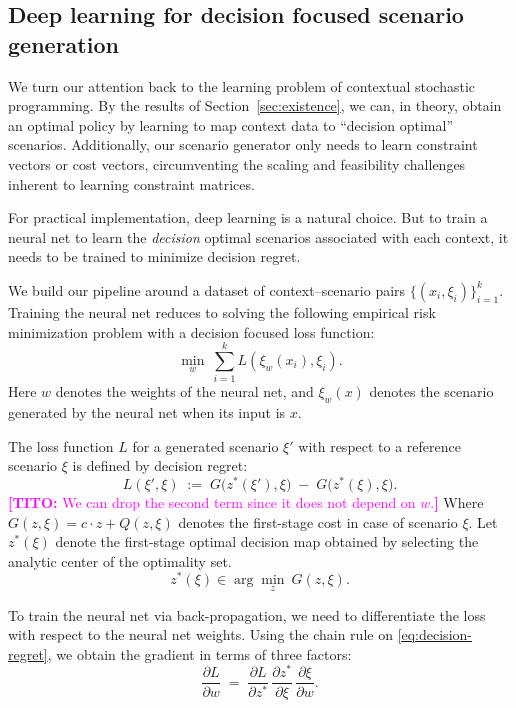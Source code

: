 \documentclass{article}
\newcommand{\thc}[1]{\textcolor{magenta}{\textbf{[TITO:} #1\textbf{]}}}
\theoremstyle{plain}
\theoremstyle{definition}
\theoremstyle{remark}
\begin{document}
\subsection{Deep learning for decision focused scenario generation}
\label{sec:deep-learning}
We turn our attention back to the learning problem of contextual stochastic programming. By the results of Section~\ref{sec:existence}, we can, in theory, obtain an optimal policy by learning to map context data to ``decision optimal'' scenarios. Additionally, our scenario generator only needs to learn constraint vectors or cost vectors, circumventing the scaling and feasibility challenges inherent to learning constraint matrices.

For practical implementation, deep learning is a natural choice. But to train a neural net to learn the \textit{decision} optimal scenarios associated with each context, it needs to be trained to minimize decision regret.

We build our pipeline around a dataset of context--scenario pairs $\{(x_i,\xi_i)\}_{i=1}^k$. Training the neural net reduces to solving the following empirical risk minimization problem with a decision focused loss function:
\begin{equation}
\label{eq:erm}
\min_{w}\ \sum_{i=1}^k L(\xi_{w}(x_i), \xi_i).
\end{equation}
Here $w$ denotes the weights of the neural net, and $\xi_w(x)$ denotes the scenario generated by the neural net when its input is $x$.

The loss function $L$ for a generated scenario $\xi'$ with respect to a reference scenario $\xi$ is defined by decision regret:
\begin{equation}
\label{eq:decision-regret}
L(\xi', \xi)
\;:=\;
G\!\big(z^*(\xi'),\xi\big)
\;-\;
G\!\big(z^*(\xi),\xi\big).
\end{equation}
\thc{We can drop the second term since it does not depend on $w$.}
Where $G(z, \xi) = c \cdot z + Q(z, \xi)$ denotes the first-stage cost in case of scenario $\xi$. Let $z^*(\xi)$ denote the first-stage optimal decision map obtained by selecting the analytic center of the optimality set.
\begin{equation}
\label{eq:decision-map}
z^*(\xi)\in \arg\min_{z}\ G(z,\xi).
\end{equation}

To train the neural net via back-propagation, we need to differentiate the loss with respect to the neural net weights. Using the chain rule on \eqref{eq:decision-regret}, we obtain the gradient in terms of three factors:
\begin{equation}
\label{eq:chain-rule}
\frac{\partial L}{\partial w} \;=\; \frac{\partial L}{\partial z^*}\,\frac{\partial z^*}{\partial \xi}\,\frac{\partial \xi}{\partial w}.
\end{equation}
\end{document}
